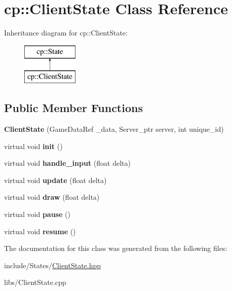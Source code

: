 \hypertarget{classcp_1_1_client_state}{}\section{cp\+:\+:Client\+State Class Reference}
\label{classcp_1_1_client_state}
Inheritance diagram for cp\+:\+:Client\+State\+:\begin{figure}[H]
\begin{center}
\leavevmode
\includegraphics[height=2.000000cm]{classcp_1_1_client_state}
\end{center}
\end{figure}
\subsection*{Public Member Functions}
\begin{DoxyCompactItemize}
\item 
\mbox{\label{classcp_1_1_client_state_a1bc5e08dad0a0a3db874f8770f70eee0}} 
{\bfseries Client\+State} (Game\+Data\+Ref \+\_\+data, Server\+\_\+ptr server, int unique\+\_\+id)
\item 
\mbox{\label{classcp_1_1_client_state_a51770935e2bb3d5b3da9172a7bb7f254}} 
virtual void {\bfseries init} ()
\item 
\mbox{\label{classcp_1_1_client_state_a06e11fa2d76322fbec09da8cf10b609e}} 
virtual void {\bfseries handle\+\_\+input} (float delta)
\item 
\mbox{\label{classcp_1_1_client_state_abb22a00f3cafa3585d737ca22e080e62}} 
virtual void {\bfseries update} (float delta)
\item 
\mbox{\label{classcp_1_1_client_state_a1846e3b9d306d00591550f1eb310ea90}} 
virtual void {\bfseries draw} (float delta)
\item 
\mbox{\label{classcp_1_1_client_state_a5ecebcbb46e52b89da6c76de4012e180}} 
virtual void {\bfseries pause} ()
\item 
\mbox{\label{classcp_1_1_client_state_a19eaed84d6ea633c2878648f0f4814c8}} 
virtual void {\bfseries resume} ()
\end{DoxyCompactItemize}


The documentation for this class was generated from the following files\+:\begin{DoxyCompactItemize}
\item 
include/\+States/\hyperlink{_client_state_8hpp}{Client\+State.\+hpp}\item 
libs/Client\+State.\+cpp\end{DoxyCompactItemize}
